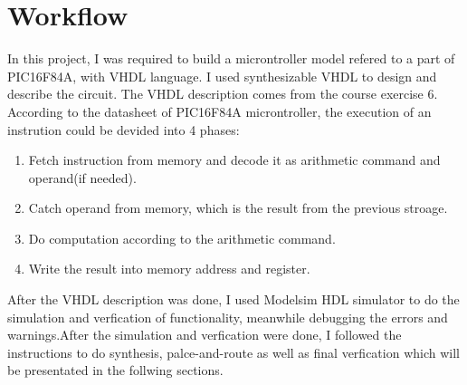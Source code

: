 \chapter{Workflow}\label{chapter1}

In this project, I was required to build a microntroller model refered to a part of PIC16F84A, with VHDL language.
I used synthesizable VHDL to design and describe the circuit. The VHDL description comes from the course exercise 6.
According to the datasheet of PIC16F84A microntroller, the execution of an instrution could be devided into 4 phases:
\begin{enumerate}
  \item Fetch instruction from memory and decode it as arithmetic command and operand(if needed).
  \item Catch operand from memory, which is the result from the previous stroage.
  \item Do computation according to the arithmetic command.
  \item Write the result into memory address and register.
\end{enumerate}

After the VHDL description was done, I used Modelsim HDL simulator to do the simulation and verfication of functionality,
meanwhile debugging the errors and warnings.After the simulation and verfication were done, I followed the instructions to do synthesis, palce-and-route as well as
final verfication which will be presentated in the follwing sections. 


